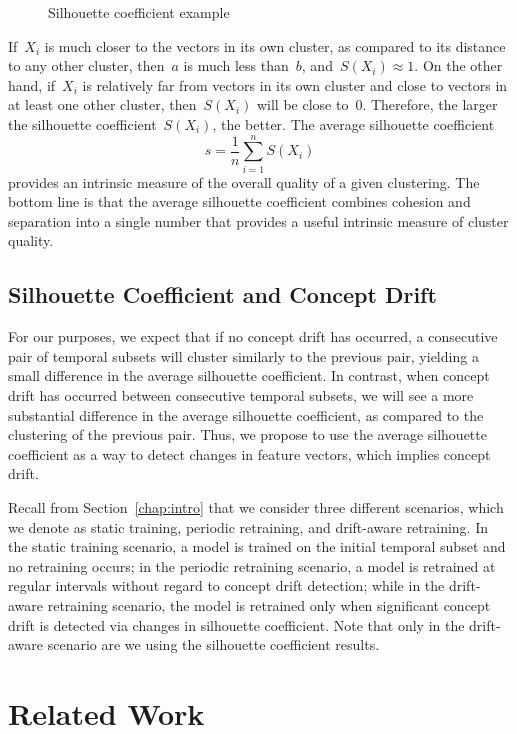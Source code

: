 \documentclass[12pt]{article}
\begin{document}
\begin{figure}[!htb]
\centering
    
\caption{Silhouette coefficient example}\label{fig:clustSilEx}
\end{figure}

If~$X_i$ is much closer to the vectors in its own cluster, as compared to
its distance to any other cluster, then~$a$ is much less than~$b$, 
and~$S(X_i)\approx 1$.
On the other hand, if~$X_i$ is relatively far from vectors in its own cluster and
close to vectors in at least one other cluster, then~$S(X_i)$ will be close to~0.
Therefore, the larger the silhouette coefficient~$S(X_i)$, the better. 
The average silhouette coefficient 
$$
  s = \frac{1}{n} \sum_{i=1}^n S(X_i)
$$
provides an intrinsic measure of the overall quality of a given clustering.
The bottom line is that the average silhouette coefficient combines 
cohesion and separation into a single number that provides
a useful intrinsic measure of cluster quality. 

\subsection {Silhouette Coefficient and Concept Drift}

For our purposes, 
we expect that if no concept drift has occurred, a consecutive pair of
temporal subsets will cluster similarly to the previous pair, yielding a small
difference in the average silhouette coefficient. In contrast, when concept
drift has occurred between consecutive temporal subsets,
we will see a more substantial difference in the average
silhouette coefficient, as compared to the clustering of the previous pair. 
Thus, we propose to use the 
average silhouette coefficient as a way to detect changes 
in feature vectors, which implies concept drift.

Recall from Section~\ref{chap:intro} that we consider three different scenarios, 
which we denote as static training, periodic retraining, and drift-aware retraining.
In the static training scenario, a model is trained on the initial temporal subset
and no retraining occurs; in the periodic retraining scenario, 
 a model is retrained at regular intervals without regard to concept drift detection;
while in the drift-aware retraining scenario, 
the model is retrained only when significant concept drift is 
detected via changes in silhouette coefficient. Note that only in the 
drift-aware scenario are we using the silhouette coefficient results.

\section{Related Work}\label{sect:rw}
\end{document}
